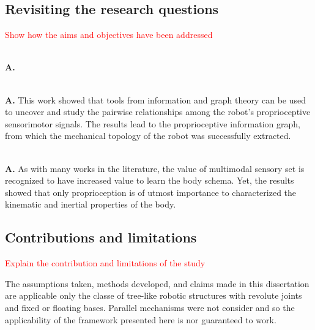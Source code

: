 \documentclass[12pt, a4paper]{article}
\newcommand{\redtext}[1]{\textcolor{red}{#1}}
\begin{document}
\subsection*{Revisiting the research questions}
\redtext{Show how the aims and objectives have been addressed}


\\
\textbf{A.} 


\\
\textbf{A.} This work showed that tools from information and graph theory can be used to uncover and study the pairwise relationships among the robot's proprioceptive sensorimotor signals. The results lead to the proprioceptive information graph, from which the mechanical topology of the robot was successfully extracted.


\\

\textbf{A.} As with many works in the literature, the value of multimodal sensory set is recognized to have increased value to learn the body schema. Yet, the results showed that only proprioception is of utmost importance to characterized the kinematic and inertial properties of the body.

\begin{shaded}
\end{shaded}

\subsection*{Contributions and limitations}
\redtext{Explain the contribution and limitations of the study}

The assumptions taken, methods developed, and claims made in this dissertation are applicable only the classe of tree-like robotic structures with revolute joints and fixed or floating bases. Parallel mechanisms were not consider and so the applicability of the framework presented here is nor guaranteed to work. 
\end{document}

